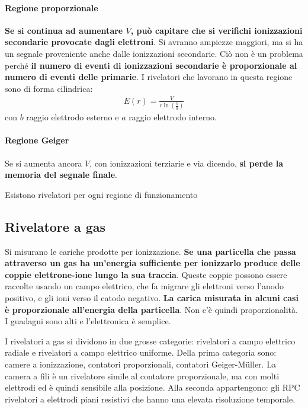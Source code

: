 \documentclass[a4paper,11pt,twoside,openany]{book}
\theoremstyle{definition}
\theoremstyle{plain}
\theoremstyle{plain}
\theoremstyle{definition}
\begin{document}
\paragraph{Regione proporzionale} \textbf{Se si continua ad aumentare $V$, può capitare che si verifichi ionizzazioni secondarie provocate dagli elettroni}. Si avranno ampiezze maggiori, ma si ha un segnale proveniente anche dalle ionizzazioni secondarie. Ciò non è un problema perché \textbf{il numero di eventi di ionizzazioni secondarie è proporzionale al numero di eventi delle primarie}. I rivelatori che lavorano in questa regione sono di forma cilindrica:
\begin{equation}\begin{split}
E\left(r\right)=\frac{V}{r\ln{\left(\frac{b}{a}\right)}}
\end{split}\end{equation}
con $b$ raggio elettrodo esterno e $a$ raggio elettrodo interno.

\paragraph{Regione Geiger} Se si aumenta ancora $V$, con ionizzazioni terziarie e via dicendo, \textbf{si perde la memoria del segnale finale}.

Esistono rivelatori per ogni regione di funzionamento

\subsection{Rivelatore a gas} %
Si misurano le cariche prodotte per ionizzazione. \textbf{Se una particella che passa attraverso un gas ha un'energia sufficiente per ionizzarlo produce delle coppie elettrone-ione lungo la sua traccia}. Queste coppie possono essere raccolte usando un campo elettrico, che fa migrare gli elettroni verso l'anodo positivo, e gli ioni verso il catodo negativo. \textbf{La carica misurata in alcuni casi è proporzionale all'energia della particella}. Non c'è quindi proporzionalità. I guadagni sono alti e l'elettronica è semplice.

I rivelatori a gas si dividono in due grosse categorie: rivelatori a campo elettrico radiale e rivelatori a campo elettrico uniforme. Della prima categoria sono: camere a ionizzazione, contatori proporzionali, contatori Geiger-Müller. La camera a fili è un rivelatore simile al contatore proporzionale, ma con molti elettrodi ed è quindi sensibile alla posizione. Alla seconda appartengono: gli RPC rivelatori a elettrodi piani resistivi che hanno una elevata risoluzione temporale.
\end{document}

